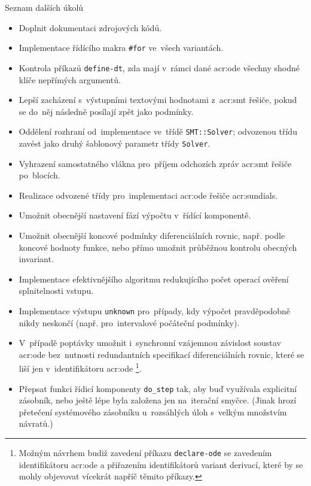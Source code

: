 \documentclass[thesis=M,czech]{FITthesis}[2012/06/26]
\newcommand{\acrlabel}[1]{acr:#1}
\newcommand{\acr}[1]{\acrshort{\acrlabel{#1}}}
\newcommand{\id}[1]{\texttt{#1}}
\begin{document}

\begin{section}{Seznam dalších úkolů}\label{s:impl:todo}
\begin{itemize}
\item Doplnit dokumentaci zdrojových kódů.
\item Implementace řídícího makra \id{\#for} ve~všech variantách.
\item Kontrola příkazů \id{define\--dt},
    zda mají v~rámci dané \acr{ode} všechny
    shodné klíče nepřímých argumentů.
\item Lepší zacházení s~výstupními textovými hodnotami z~\acr{smt}
   řešiče, pokud se do~něj následně posílají zpět jako podmínky.
\item Oddělení rozhraní od~implementace ve~třídě \id{SMT::\-Solver};
   odvozenou třídu zavést jako druhý šablonový parametr třídy \id{Solver}.
\item Vyhrazení samostatného vlákna pro~příjem
   odchozích zpráv \acr{smt} řešiče po~blocích.
\item Realizace odvozené třídy pro~implementaci
   \acr{ode} řešiče \acr{sundials}.
\item Umožnit obecnější nastavení fází výpočtu v~řídící komponentě.
\item Umožnit obecnější koncové podmínky diferenciálních rovnic,
   např. podle koncové hodnoty funkce,
   nebo přímo umožnit průběžnou kontrolu obecných invariant.
\item Implementace efektivnějšího algoritmu
   redukujícího počet operací ověření splnitelnosti vstupu.
\item Implementace výstupu \id{unknown} pro~případy,
   kdy výpočet pravděpodobně nikdy neskončí
   (např. pro~intervalové počáteční podmínky).
\item V~případě poptávky umožnit i~synchronní
   vzájemnou závislost soustav \acr{ode}
   bez~nutnosti redundantních
   specifikací diferenciálních rovnic,
   které se liší jen v~identifikátoru \acr{ode}%
   \footnote{Možným návrhem budiž zavedení příkazu
   \id{declare\--ode} se zavedením identifikátoru \acr{ode}
   a přiřazením identifikátorů variant derivací,
   které by se mohly objevovat vícekrát napříč těmito příkazy.}.
\item Přepsat funkci řídicí komponenty \id{do\_\-step} tak,
   aby buď využívala explicitní zásobník,
   nebo ještě lépe byla založena jen na~iterační smyčce.
   (Jinak hrozí přetečení systémového zásobníku
    u~rozsáhlých úloh s~velkým množstvím návratů.)
\end{itemize}
\end{section} %
\end{document}
